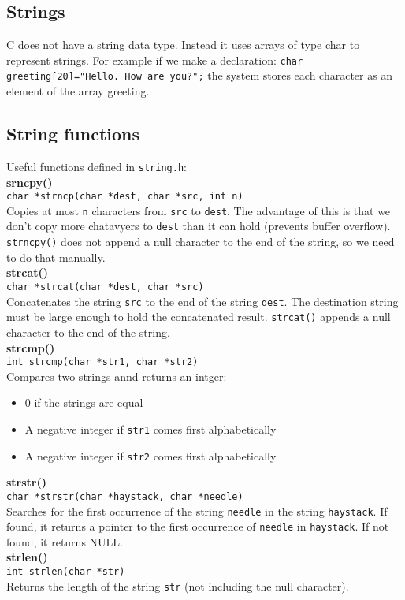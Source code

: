 \documentclass[a4paper, 10pt]{article}
\begin{document}
\subsection{Strings}
C does not have a string data type. Instead it uses arrays of type char to represent strings. For example if we make a declaration:
\texttt{char greeting[20]="Hello. How are you?";}
the system stores each character as an element of the array greeting.


\subsection{String functions}
Useful functions defined in \texttt{string.h}: \\[2ex]
\textbf{srncpy()} \\
\texttt{char *strncp(char *dest, char *src, int n)} \\
Copies at most \texttt{n} characters from \texttt{src} to \texttt{dest}. The advantage of this is that we don't copy more chatavyers to \texttt{dest} than it can hold (prevents buffer overflow). \texttt{strncpy()} does not append a null character to the end of the string, so we need to do that manually. \\[2ex]
\textbf{strcat()} \\
\texttt{char *strcat(char *dest, char *src)} \\
Concatenates the string \texttt{src} to the end of the string \texttt{dest}. The destination string must be large enough to hold the concatenated result. \texttt{strcat()} appends a null character to the end of the string. \\[2ex]
\textbf{strcmp()} \\
\texttt{int strcmp(char *str1, char *str2)} \\
Compares two strings annd returns an intger:
\begin{itemize}
    \item 0 if the strings are equal
    \item A negative integer if \texttt{str1} comes first alphabetically
    \item A negative integer if \texttt{str2} comes first alphabetically
\end{itemize}
\textbf{strstr()} \\
\texttt{char *strstr(char *haystack, char *needle)} \\
Searches for the first occurrence of the string \texttt{needle} in the string \texttt{haystack}. If found, it returns a pointer to the first occurrence of \texttt{needle} in \texttt{haystack}. If not found, it returns NULL. \\[2ex]
\textbf{strlen()} \\
\texttt{int strlen(char *str)} \\
Returns the length of the string \texttt{str} (not including the null character).
\end{document}
